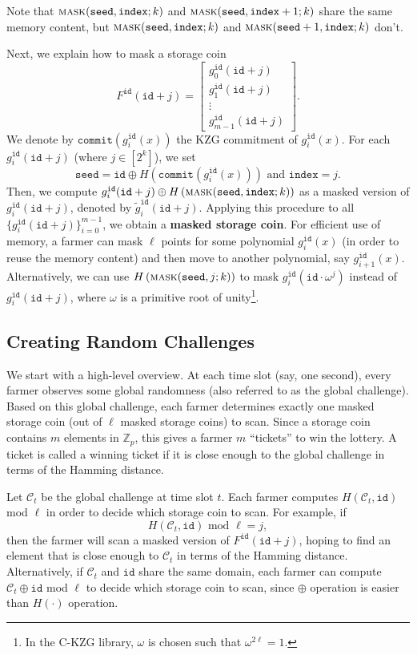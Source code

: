 \documentclass[12pt,draftcls,onecolumn]{IEEEtran}
\newcommand{\Fp}{\mathbb{Z}_p}
\newcommand{\id}{\texttt{id}}
\newcommand{\seed}{\texttt{seed}}
\newcommand{\ind}{\texttt{index}}
\newcommand{\cmt}{\texttt{commit}}
\newcommand{\mask}{\textsc{mask}}
\begin{document}
Note that $\mask(\seed, \ind; k)$ and $\mask(\seed, \ind + 1; k)$ share the same memory content, but $\mask(\seed, \ind; k)$
and $\mask(\seed + 1, \ind; k)$ don't. 

Next, we explain how to mask a storage coin
\[
F^{\id}(\id + j) = \begin{bmatrix} g_0^{\id}(\id + j)\\ g_1^{\id}(\id + j)\\  \vdots \\ g_{m-1}^{\id}(\id + j) \end{bmatrix}.
\]
We denote by $\cmt\left(g_i^{\id}(x)\right)$ the KZG commitment of $g_i^{\id}(x)$.
For each $g_i^{\id}(\id + j)$ (where $j \in [2^k]$), we set
\[
\seed = \id \oplus H\left( \cmt\left(g_i^{\id}(x)\right) \right) \mbox{ and } \ind = j.
\]
Then, we compute $g_i^{\id}(\id + j) \oplus H\left( \mask(\seed, \ind; k) \right)$ as a masked version of $g_i^{\id}(\id + j)$, denoted by $\tilde{g}_i^{\id}(\id + j)$.
Applying this procedure to all $\{ g_i^{\id}(\id + j) \}_{i = 0}^{m - 1}$, we obtain a {\bf masked storage coin}.
For efficient use of memory, a farmer can mask $\ell$ points for some polynomial $g_i^{\id}(x)$ (in order to reuse the memory content) and then move to another polynomial, say $g_{i+1}^{\id}(x)$.
Alternatively,
we can use $H\left( \mask(\seed, j; k) \right)$ to mask $g_i^{\id}(\id \cdot \omega^j)$ instead of $g_i^{\id}(\id + j)$, where $\omega$ is a primitive root of unity\footnote{In the C-KZG library, $\omega$ is chosen such that $\omega^{2 \ell} = 1$.}.

\subsection{Creating Random Challenges}

We start with a high-level overview. At each time slot (say, one second), every farmer observes some global randomness (also referred to as the global challenge). 
Based on this global challenge, each farmer determines exactly one masked storage coin (out of $\ell$ masked storage coins) to scan. Since a storage coin contains $m$ elements in $\Fp$, this gives a farmer $m$ ``tickets'' to win the lottery. A ticket is called a winning ticket if it is close enough to the global challenge in terms of the Hamming distance.

Let $\mathcal{C}_t$ be the global challenge at time slot $t$. Each farmer computes $H(\mathcal{C}_t, \id)$ mod $\ell$ in order to decide which storage coin to scan.
For example, if 
\[
H(\mathcal{C}_t, \id) \mbox{ mod } \ell = j,
\]
then the farmer will scan a masked version of $F^{\id}(\id + j)$, hoping to find an element that is close enough to $\mathcal{C}_t$ in terms of the Hamming distance. 
Alternatively, if $\mathcal{C}_t$ and $\id$ share the same domain, each farmer can compute $\mathcal{C}_t \oplus \id$ mod $\ell$ to decide which storage coin to scan, since $\oplus$ operation is easier than $H(\cdot)$ operation. 
\end{document}
